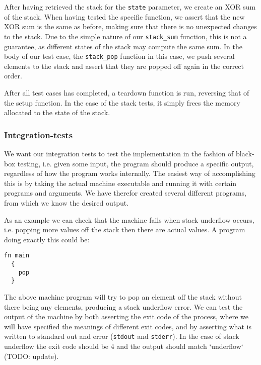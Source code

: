 After having retrieved the stack for the {\tt state} parameter, we create an XOR
sum of the stack. When having tested the specific function, we assert that the
new XOR sum is the same as before, making sure that there is no unexpected
changes to the stack. Due to the simple nature of our {\tt stack\_sum} function,
this is not a guarantee, as different states of the stack may compute the same
sum. %
In the body of our test case, the {\tt stack\_pop} function in this case, we
push several elements to the stack and assert that they are popped off again in
the correct order.

After all test cases has completed, a teardown function is run, reversing that
of the setup function. In the case of the stack tests, it simply frees the
memory allocated to the state of the stack.
%


\subsubsection{Integration-tests}
We want our integration tests to test the implementation in the fashion of
black-box testing, i.e. given some input, the program should produce a specific
output, regardless of how the program works internally. The easiest way of
accomplishing this is by taking the actual machine executable and running it
with certain programs and arguments. We have therefor created several different
programs, from which we know the desired output.

As an example we can check that the machine fails when stack underflow occurs,
i.e. popping more values off the stack then there are actual values. A program
doing exactly this could be:
\begin{lstlisting}[language={bytecode},caption={Machine program producing
    stack underflow}]
  fn main
  {
    pop
  }
\end{lstlisting}

The above machine program will try to pop an element off the stack without there
being any elements, producing a stack underflow error. We can test the output of
the machine by both asserting the exit code of the process, where we will have
specified the meanings of different exit codes, and by asserting what is written
to standard out and error ({\tt stdout} and {\tt stderr}). In the case of stack
underflow the exit code should be 4 and the output should match `underflow`
(TODO: update).

